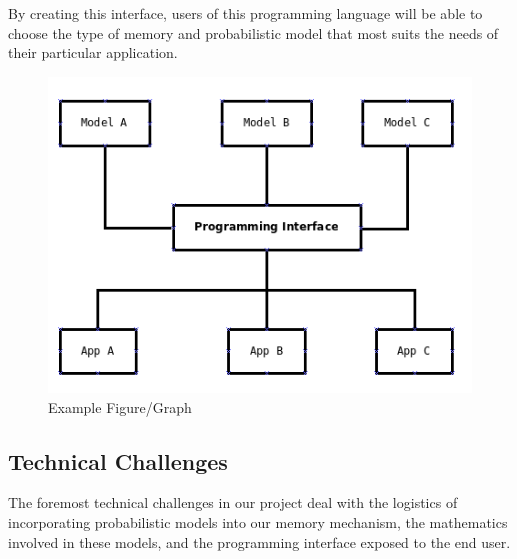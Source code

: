 \documentclass{sig-alternate}
\begin{document}
By creating this interface, users of this programming language will be able to
choose the type of memory and probabilistic model that most suits the needs of their particular
application. 

\begin{figure}[H]
	\begin{center}
		\includegraphics[width=0.90\linewidth]{block}
	\end{center}
	\vspace{-12pt}
	\caption{Example Figure/Graph}
	\label{fig:block}
\end{figure}

%

\subsection{Technical Challenges}
\label{subsec:tech_challenges}
The foremost technical challenges in our project deal with the logistics of incorporating
probabilistic models into our memory mechanism, the mathematics involved in these models,
and the programming interface exposed to the end user.
\end{document}
